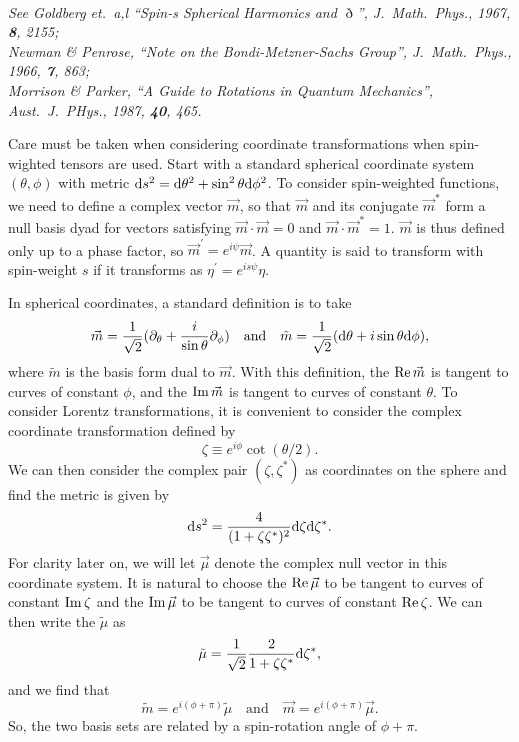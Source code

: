\documentclass[11pt]{article}
\begin{document}
\newpage
{}\\ {\em See Goldberg et.\ a,l
  ``Spin-s Spherical Harmonics and $\eth$'', J.\ Math.\ Phys., 1967,
  {\bf 8}, 2155;\\ Newman \& Penrose, ``Note on the
  Bondi-Metzner-Sachs Group'', J.\ Math.\ Phys., 1966, {\bf 7}, 863;\\
  Morrison \& Parker, ``A Guide to Rotations in Quantum Mechanics'',
  Aust.\ J.\ PHys., 1987, {\bf 40}, 465.}
\vspace{0.25in}

Care must be taken when considering coordinate transformations when
spin-wighted tensors are used.  Start with a standard spherical
coordinate system $(\theta,\phi)$ with metric ${\rm d}s^2={\rm
  d}\theta^2+\sin^2\theta{\rm d}\phi^2$.  To consider spin-weighted
functions, we need to define a complex vector $\vec{m}$, so that
$\vec{m}$ and its conjugate $\vec{m}^*$ form a null basis dyad for
vectors satisfying $\vec{m}\cdot\vec{m}=0$ and
$\vec{m}\cdot\vec{m}^*=1$.  $\vec{m}$ is thus defined only up to a
phase factor, so $\vec{m}^\prime=e^{i\psi}\vec{m}$.  A quantity is
said to transform with spin-weight $s$ if it transforms as
$\eta^\prime=e^{is\psi}\eta$.

In spherical coordinates, a standard definition is to take
\begin{equation}
  \vec{m} = \frac1{\sqrt2}(\partial_\theta + \frac{i}{\sin\theta}\partial_\phi)
\quad\mbox{and}\quad
  \tilde{m} = \frac1{\sqrt2}({\rm d}\theta + i\sin\theta{\rm d}\phi),
\end{equation}
where $\tilde{m}$ is the basis form dual to $\vec{m}$.  With this
definition, the ${\rm Re}\,\vec{m}$ is tangent to curves of constant
$\phi$, and the ${\rm Im}\,\vec{m}$ is tangent to curves of constant
$\theta$.  To consider Lorentz transformations, it is convenient to
consider the complex coordinate transformation defined by
\begin{equation}
  \zeta\equiv e^{i\phi}\cot(\theta/2).
\end{equation}
We can then consider the complex pair $(\zeta,\zeta^*)$ as coordinates
on the sphere and find the metric is given by
\begin{equation}
{\rm d}s^2 = \frac4{(1+\zeta\zeta^*)^2}{\rm d}\zeta{\rm d}\zeta^*.
\end{equation}
For clarity later on, we will let $\vec\mu$ denote the complex null
vector in this coordinate system.  It is natural to choose the ${\rm
  Re}\,\vec\mu$ to be tangent to curves of constant ${\rm Im}\,\zeta$
and the ${\rm Im}\,\vec\mu$ to be tangent to curves of constant ${\rm
  Re}\,\zeta$.  We can then write the $\tilde\mu$ as
\begin{equation}
  \tilde\mu = \frac1{\sqrt2}\frac2{1+\zeta\zeta^*}{\rm d}\zeta^*,
\end{equation}
and we find that
\begin{equation}
  \tilde{m} = e^{i(\phi+\pi)}\tilde\mu
\quad\mbox{and}\quad \vec{m} = e^{i(\phi+\pi)}\vec\mu.
\end{equation}
So, the two basis sets are related by a spin-rotation angle of $\phi+\pi$.
\end{document}
